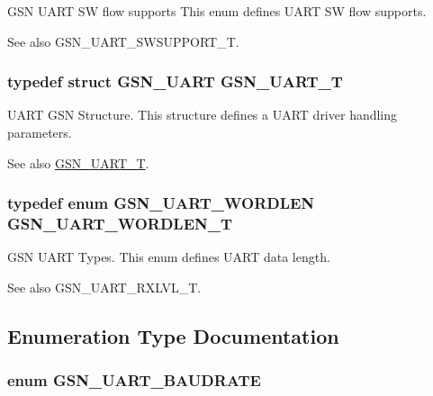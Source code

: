 GSN UART SW flow supports This enum defines UART SW flow supports. 

\begin{DoxySeeAlso}{See also}
GSN\_\-UART\_\-SWSUPPORT\_\-T. 
\end{DoxySeeAlso}
\hypertarget{a00656_gacd6ebb3a4883ec781b873a90dbed102a}{
\subsubsection[{GSN\_\-UART\_\-T}]{\setlength{\rightskip}{0pt plus 5cm}typedef struct {\bf GSN\_\-UART} {\bf GSN\_\-UART\_\-T}}}
\label{a00656_gacd6ebb3a4883ec781b873a90dbed102a}


UART GSN Structure. This structure defines a UART driver handling parameters. 

\begin{DoxySeeAlso}{See also}
\hyperlink{a00656_gacd6ebb3a4883ec781b873a90dbed102a}{GSN\_\-UART\_\-T}. 
\end{DoxySeeAlso}
\hypertarget{a00656_gac850885034c791e458a2edf4a0530f67}{
\subsubsection[{GSN\_\-UART\_\-WORDLEN\_\-T}]{\setlength{\rightskip}{0pt plus 5cm}typedef enum {\bf GSN\_\-UART\_\-WORDLEN} {\bf GSN\_\-UART\_\-WORDLEN\_\-T}}}
\label{a00656_gac850885034c791e458a2edf4a0530f67}


GSN UART Types. This enum defines UART data length. 

\begin{DoxySeeAlso}{See also}
GSN\_\-UART\_\-RXLVL\_\-T. 
\end{DoxySeeAlso}


\subsection{Enumeration Type Documentation}
\hypertarget{a00656_ga99b0d3d670ac3d61d3a8764fafc3b992}{
\subsubsection[{GSN\_\-UART\_\-BAUDRATE}]{\setlength{\rightskip}{0pt plus 5cm}enum {\bf GSN\_\-UART\_\-BAUDRATE}}}
\label{a00656_ga99b0d3d670ac3d61d3a8764fafc3b992}


